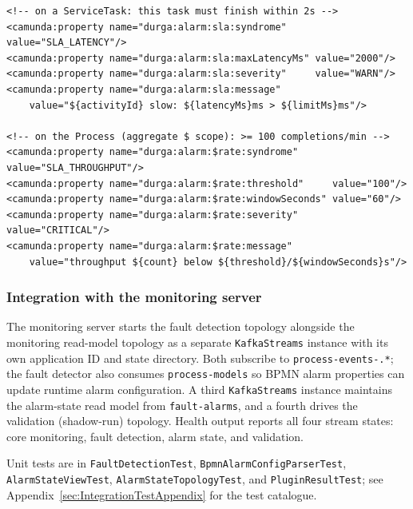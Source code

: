 \begin{verbatim}
<!-- on a ServiceTask: this task must finish within 2s -->
<camunda:property name="durga:alarm:sla:syndrome"     value="SLA_LATENCY"/>
<camunda:property name="durga:alarm:sla:maxLatencyMs" value="2000"/>
<camunda:property name="durga:alarm:sla:severity"     value="WARN"/>
<camunda:property name="durga:alarm:sla:message"
    value="${activityId} slow: ${latencyMs}ms > ${limitMs}ms"/>

<!-- on the Process (aggregate $ scope): >= 100 completions/min -->
<camunda:property name="durga:alarm:$rate:syndrome"      value="SLA_THROUGHPUT"/>
<camunda:property name="durga:alarm:$rate:threshold"     value="100"/>
<camunda:property name="durga:alarm:$rate:windowSeconds" value="60"/>
<camunda:property name="durga:alarm:$rate:severity"      value="CRITICAL"/>
<camunda:property name="durga:alarm:$rate:message"
    value="throughput ${count} below ${threshold}/${windowSeconds}s"/>
\end{verbatim}

\subsubsection{Integration with the monitoring server}

The monitoring server starts the fault detection topology alongside the
monitoring read-model topology as a separate \texttt{KafkaStreams} instance
with its own application ID and state directory. Both subscribe to
\texttt{process-events-.*}; the fault detector also consumes
\texttt{process-models} so BPMN alarm properties can update runtime alarm
configuration. A third \texttt{KafkaStreams} instance maintains the alarm-state
read model from \texttt{fault-alarms}, and a fourth drives the validation
(shadow-run) topology. Health output reports all four stream states: core
monitoring, fault detection, alarm state, and validation.

Unit tests are in \texttt{FaultDetectionTest}, \texttt{BpmnAlarmConfigParserTest},
\texttt{AlarmStateViewTest},
\texttt{AlarmStateTopologyTest}, and \texttt{PluginResultTest};
see Appendix~\ref{sec:IntegrationTestAppendix} for the test catalogue.
